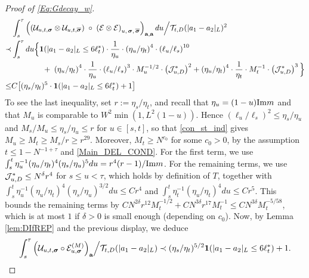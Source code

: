 \begin{proof}[Proof of \eqref{Eq:Gdecay_w}]
\begin{align}\label{51}
& \int_s^\tau  \left( \left(\mathcal{U}_{u,t,  \boldsymbol{\sigma}}
   \otimes 
   \mathcal{U}_{u, t,  \overline{\boldsymbol{\sigma}}}
   \right) \;\circ  \;
   \left( \mathcal{E}\otimes  \mathcal{E} \right)
   _{u, \,\boldsymbol{\sigma},\, \overline{\boldsymbol{\sigma}} }
   \right)_{{\textbf a}, {\textbf a}}  d u
 \Big/{\cal T}_{t, D}(|a_1-a_2|_{L})^2  \nonumber \\
 \prec  &   \int_s^\tau   d u \Big \{ 
 {\bf1}(|a_1-a_2|_{L}\le 6\ell_t^*)\cdot  \frac{1} {\eta_u} \cdot \left(\eta_u / \eta_t\right)^4\cdot \left(\ell_u / \ell_s\right)^{10}
\nonumber \\
&\qquad\qquad+ \;  \left(\eta_u / \eta_t\right)^4\cdot\frac{1}{\eta_u} 
  \cdot\left(\ell_u / \ell_s\right)^{3}\cdot
       M_{u}^{-1/2}  \cdot \left({\cal J}^{*}_{u,D} \right)^{2 }+\left(\eta_u / \eta_t\right)^4\cdot\frac{1}{\eta_t} 
  \cdot
       M_{t}^{-1}  \cdot \left({\cal J}^{*}_{u,D} \right)^{3 }  \Big \}   \nonumber \\
\le  &   C \big [ (\eta_s/\eta_t)^{5}  \cdot {\bf 1}(|a_1-a_2|_{L}\le 6\ell_t^*)+1 \big ]
 \end{align}
To see the last inequality, set $r:=\eta_s/\eta_t$, and recall that $\eta_u=(1-u)\mathrm{Im} m$ and that $M_{u}$ is comparable to $W^{2}\min(1,L^{2}(1-u))$. Hence $(\ell_u/\ell_s)^{2}\leq\eta_s/\eta_u$ and $M_s/M_u\leq\eta_s/\eta_u\leq r$ for $u\in[s,t]$, so that \eqref{con_st_ind} gives $M_u\geq M_t\geq M_s/r\geq r^{29}$. Moreover, $M_t\geq N^{c_0}$ for some $c_0>0$, by the assumption $t\leq1-N^{-1+\tau}$ and \eqref{Main_DEL_COND}. For the first term, we use $\int_s^t\eta_u^{-1}(\eta_u/\eta_t)^4(\eta_s/\eta_u)^5du=r^4(r-1)/\mathrm{Im} m$. For the remaining terms, we use ${\cal J}^{*}_{u,D}\leq N^{\delta}r^4$ for $s\leq u<\tau$, which holds by definition of $T$, together with $\int_s^t\eta_u^{-1}(\eta_u/\eta_t)^4(\eta_s/\eta_u)^{3/2}du\leq Cr^4$ and $\int_s^t\eta_t^{-1}(\eta_u/\eta_t)^4du\leq Cr^5$. This bounds the remaining terms by $CN^{2\delta}r^{12}M_t^{-1/2}+CN^{3\delta}r^{17}M_t^{-1}\leq CN^{3\delta}M_t^{-5/58}$, which is at most $1$ if $\delta>0$ is small enough (depending on $c_0$).
Now, by Lemma \ref{lem:DIfREP} and the previous display, we deduce
%
\begin{align*}
\int_{s}^{\tau}\Big({\cal U}_{u,t,\boldsymbol{\sigma}}\circ{\cal E}^{(M)}_{u,\boldsymbol{\sigma}}\Big)_{\textbf{a}}\Big/{\cal T}_{t, D}(|a_1-a_2|_{L})\prec (\eta_{s}/\eta_{t})^{5/2}\mathbf{1}(|a_{1}-a_{2}|_{L}\leq6\ell_{t}^{*})+1. 
\end{align*}

\end{proof}
